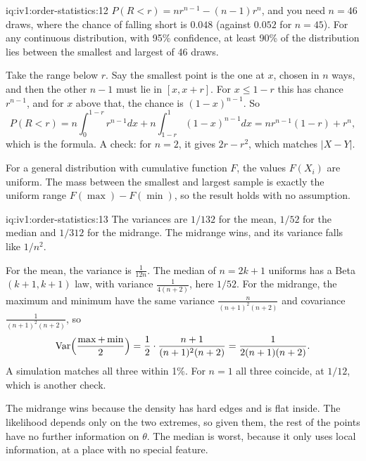 \begin{solution}{iq:iv1:order-statistics:12}
$P(R < r) = n r^{n - 1} - (n - 1) r^n$, and you need $n = 46$ draws, where the chance of falling short is $0.048$ (against $0.052$ for $n = 45$). For any continuous distribution, with 95\% confidence, at least 90\% of the distribution lies between the smallest and largest of 46 draws.

Take the range below $r$. Say the smallest point is the one at $x$, chosen in $n$ ways, and then the other $n - 1$ must lie in $[x, x + r]$. For $x \le 1 - r$ this has chance $r^{n - 1}$, and for $x$ above that, the chance is $(1 - x)^{n - 1}$. So
\[
P(R < r) = n\int_0^{1 - r} r^{n - 1}dx + n\int_{1 - r}^1 (1 - x)^{n - 1} dx = n r^{n - 1}(1 - r) + r^n,
\]
which is the formula. A check: for $n = 2$, it gives $2r - r^2$, which matches $|X - Y|$.

For a general distribution with cumulative function $F$, the values $F(X_i)$ are uniform. The mass between the smallest and largest sample is exactly the uniform range $F(\max) - F(\min)$, so the result holds with no assumption.

\end{solution}

\begin{solution}{iq:iv1:order-statistics:13}
The variances are $1/132$ for the mean, $1/52$ for the median and $1/312$ for the midrange. The midrange wins, and its variance falls like $1/n^2$.

For the mean, the variance is $\frac{1}{12n}$. The median of $n = 2k + 1$ uniforms has a Beta$(k + 1, k + 1)$ law, with variance $\frac{1}{4(n + 2)}$, here $1/52$. For the midrange, the maximum and minimum have the same variance $\frac{n}{(n + 1)^2(n + 2)}$ and covariance $\frac{1}{(n + 1)^2(n + 2)}$, so
\[
\mathrm{Var}\Bigl(\frac{\max + \min}{2}\Bigr) = \frac{1}{2} \cdot \frac{n + 1}{(n + 1)^2(n + 2)} = \frac{1}{2(n + 1)(n + 2)}.
\]
A simulation matches all three within 1\%. For $n = 1$ all three coincide, at $1/12$, which is another check.

The midrange wins because the density has hard edges and is flat inside. The likelihood depends only on the two extremes, so given them, the rest of the points have no further information on $\theta$. The median is worst, because it only uses local information, at a place with no special feature.

\end{solution}

